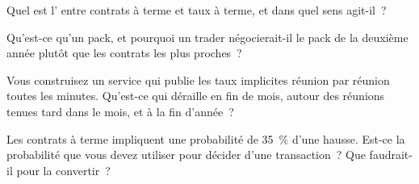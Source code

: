 \begin{interviewq}\label{iq:m2:short-term-interest-rate-futures:3}
Quel est l' entre contrats à terme et taux à terme, et dans quel
sens agit-il~?
\end{interviewq}

\begin{interviewq}\label{iq:m2:short-term-interest-rate-futures:4}
Qu'est-ce qu'un pack, et pourquoi un trader négocierait-il le pack de la deuxième année plutôt que
les contrats les plus proches~?
\end{interviewq}

\begin{interviewq}\label{iq:m2:short-term-interest-rate-futures:5}
Vous construisez un service qui publie les taux implicites réunion par réunion
toutes les minutes. Qu'est-ce qui déraille en fin de mois, autour des réunions tenues tard dans le mois, et à
la fin d'année~?
\end{interviewq}

\begin{interviewq}\label{iq:m2:short-term-interest-rate-futures:6}
Les contrats à terme impliquent une probabilité de 35~\% d'une hausse. Est-ce la probabilité que vous devez utiliser
pour décider d'une transaction~? Que faudrait-il pour la convertir~?
\end{interviewq}
